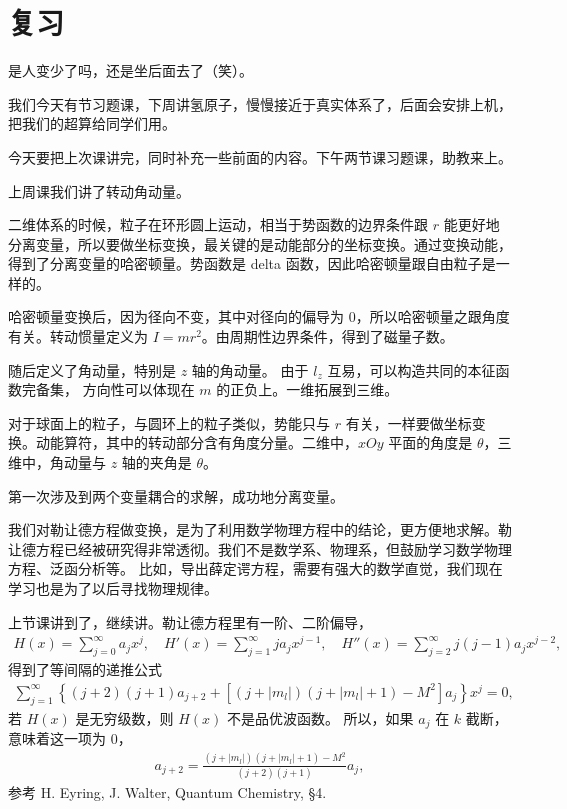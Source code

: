 
\section{复习}
是人变少了吗，还是坐后面去了（笑）。

我们今天有节习题课，下周讲氢原子，慢慢接近于真实体系了，后面会安排上机，把我们的超算给同学们用。

今天要把上次课讲完，同时补充一些前面的内容。下午两节课习题课，助教来上。

上周课我们讲了转动角动量。

二维体系的时候，粒子在环形圆上运动，相当于势函数的边界条件跟 $r$ 能更好地分离变量，所以要做坐标变换，最关键的是动能部分的坐标变换。通过变换动能，得到了分离变量的哈密顿量。势函数是 delta 函数，因此哈密顿量跟自由粒子是一样的。

哈密顿量变换后，因为径向不变，其中对径向的偏导为 0，所以哈密顿量之跟角度有关。转动惯量定义为 $I = mr^2$。由周期性边界条件，得到了磁量子数。

随后定义了角动量，特别是 $z$ 轴的角动量。
由于 $l_z$ 互易，可以构造共同的本征函数完备集，
方向性可以体现在 $m$ 的正负上。一维拓展到三维。

对于球面上的粒子，与圆环上的粒子类似，势能只与 $r$ 有关，一样要做坐标变换。动能算符，其中的转动部分含有角度分量。二维中，$xOy$ 平面的角度是 $\theta$，三维中，角动量与 $z$ 轴的夹角是 $\theta$。

第一次涉及到两个变量耦合的求解，成功地分离变量。

我们对勒让德方程做变换，是为了利用数学物理方程中的结论，更方便地求解。勒让德方程已经被研究得非常透彻。我们不是数学系、物理系，但鼓励学习数学物理方程、泛函分析等。
比如，导出薛定谔方程，需要有强大的数学直觉，我们现在学习也是为了以后寻找物理规律。

上节课讲到了，继续讲。勒让德方程里有一阶、二阶偏导，
\begin{align}
    H(x) = \sum_{j=0}^{\infty} a_j x^j, \quad H'(x) = \sum_{j=1}^{\infty} j a_j x^{j-1}, \quad H''(x) = \sum_{j=2}^{\infty} j(j-1) a_j x^{j-2},
\end{align}
得到了等间隔的递推公式
\begin{align}
    \sum_{j=1}^\infty
    \left\{
        (j+2)(j+1) a_{j+2} + \left[
            (j+ |m_l|)(j+ |m_l| +1) - M^2
        \right]a_j
    \right\} x^j = 0,
\end{align}
若 $H(x)$ 是无穷级数，则 $H(x)$ 不是品优波函数。
所以，如果 $a_j$ 在 $k$ 截断，意味着这一项为 0，
\begin{align}
    a_{j+2} = \frac{(j+|m_l|)(j+|m_l|+1) - M^2}{(j+2)(j+1)} a_j,
\end{align}
参考 H. Eyring, J. Walter, Quantum Chemistry, \S 4. 

